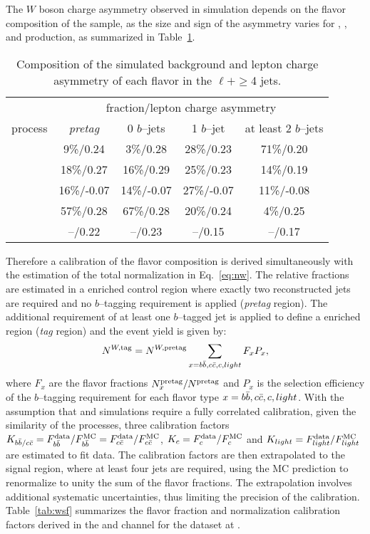 The $W$ boson charge asymmetry observed in simulation depends
on the flavor composition of the sample, as the size and sign of the
asymmetry varies for \wbb{}, \wcc{}, \wc{} and \wlight{} production,
as summarized in Table~\ref{tab:wca}.
\begin{table}
  \centering
  \begin{tabular}{lcccc}
    \toprule
     & \multicolumn{4}{c}{fraction/lepton charge asymmetry} \\
    process & {\it pretag} & 0 $b$--jets & 1 $b$--jet & at least 2 $b$--jets \\
    \midrule
    \wbb{} & 9\%/0.24 & 3\%/0.28 & 28\%/0.23 & 71\%/0.20 \\
    \wcc{} & 18\%/0.27 & 16\%/0.29 & 25\%/0.23 & 14\%/0.19 \\
    \wc{} & 16\%/-0.07 & 14\%/-0.07 & 27\%/-0.07 & 11\%/-0.08 \\
    \wlight{} & 57\%/0.28 & 67\%/0.28 & 20\%/0.24 & 4\%/0.25 \\ 
    \midrule
    \wjets{} & --/0.22 & --/0.23 & --/0.15 & --/0.17 \\
   \bottomrule
  \end{tabular}
  \caption{Composition of the simulated \wjets{} background and lepton charge
    asymmetry of each flavor in the $\ell+\geq$4 jets.}
  \label{tab:wca}
\end{table}
Therefore a calibration of the flavor composition is derived
simultaneously with the estimation of the total normalization in
Eq.~\ref{eq:nw}.
The relative fractions are estimated in a \wjets{} enriched control
region where exactly two reconstructed jets are required and no
$b$--tagging requirement is applied ({\it pretag} region). 
The additional requirement of at least one $b$--tagged jet is applied
to define a \wbb{} enriched region ({\it tag} region) and the \wjets{}
event yield is given by: 
\begin{equation}
\label{eq:nwt}
N^{W,{\rm tag}} = 
N^{W,{\rm pretag}}
\sum_{x=b\bar{b}{}, c\bar{c}{}, c, light} F_xP_x,
\end{equation}
where $F_x$ are the flavor fractions $N^{\rm pretag}_x/N^{\rm pretag}$
and $P_x$ is the selection efficiency of the $b$--tagging requirement for each
flavor type $x = b\bar{b}{}, c\bar{c}{}, c, light$. 
 With the assumption that \wbb{} and \wcc{} simulations require a
 fully correlated calibration, given the similarity of the processes,
 three calibration factors $K_{b\bar{b}{}/c\bar{c}{}}=F^{\rm
   data}_{b\bar{b}{}}/F^{\rm MC}_{b\bar{b}{}}=F^{\rm
   data}_{c\bar{c}{}}/F^{\rm MC}_{c\bar{c}{}}$, $K_c=F^{\rm
   data}_{c}/F^{\rm MC}_{c}$ and $K_{light}=F^{\rm
   data}_{light}/F^{\rm MC}_{light}$ are estimated to fit data. The
 calibration factors are then extrapolated to the signal region, where
 at least four jets are required, using the MC prediction
to renormalize to unity the sum of the flavor fractions.
The extrapolation involves additional systematic uncertainties, thus
limiting the precision of the calibration.
Table~\ref{tab:wsf} summarizes the flavor fraction and normalization
calibration factors derived in the \ejets{} and \mujets{} channel for
the dataset at \seventev{}.

